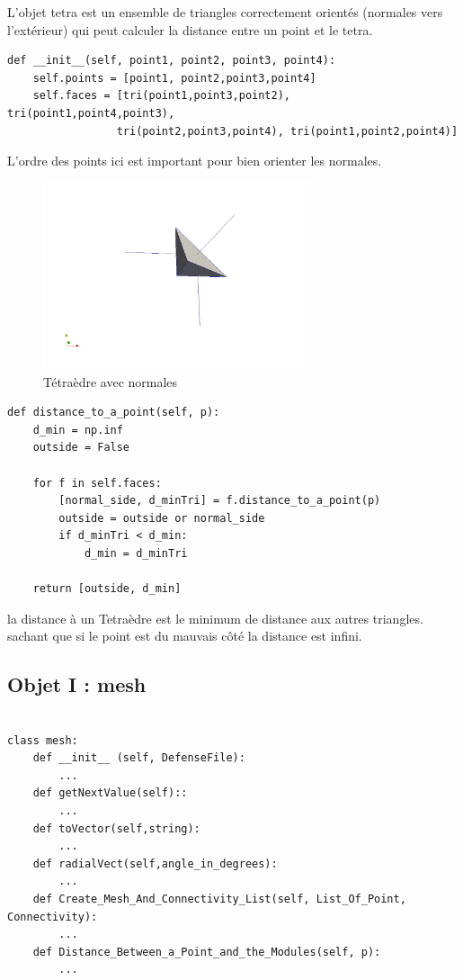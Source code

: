 \documentclass[french]{article}
\begin{document}
L'objet tetra est un ensemble de triangles correctement orientés (normales vers l'extérieur) qui peut
calculer la distance entre un point et le tetra.
\begin{verbatim}
def __init__(self, point1, point2, point3, point4):
	self.points = [point1, point2,point3,point4]
	self.faces = [tri(point1,point3,point2), tri(point1,point4,point3),
				 tri(point2,point3,point4), tri(point1,point2,point4)]
\end{verbatim}
L'ordre des points ici est important pour bien orienter les normales.
\begin{figure}[h]
	\centering
	\includegraphics[width=0.7\textwidth]{Figures/TetraNormals.png}
	\caption{Tétraèdre avec normales}
\end{figure}

\begin{verbatim}
def distance_to_a_point(self, p):
	d_min = np.inf 
	outside = False
	
	for f in self.faces:
		[normal_side, d_minTri] = f.distance_to_a_point(p)
		outside = outside or normal_side
		if d_minTri < d_min:
			d_min = d_minTri
	
	return [outside, d_min] 
\end{verbatim}
la distance à un Tetraèdre est le minimum de distance aux autres triangles. sachant que si le point
est du mauvais côté la distance est infini.

\subsection{Objet I : mesh}
\vspace{10pt}
\begin{verbatim}

class mesh:
	def __init__ (self, DefenseFile):
		...
	def getNextValue(self)::
		...
	def toVector(self,string):
		...
	def	radialVect(self,angle_in_degrees):
		...
	def Create_Mesh_And_Connectivity_List(self, List_Of_Point, Connectivity):
		...
	def Distance_Between_a_Point_and_the_Modules(self, p):
		...

\end{verbatim}
\end{document}
